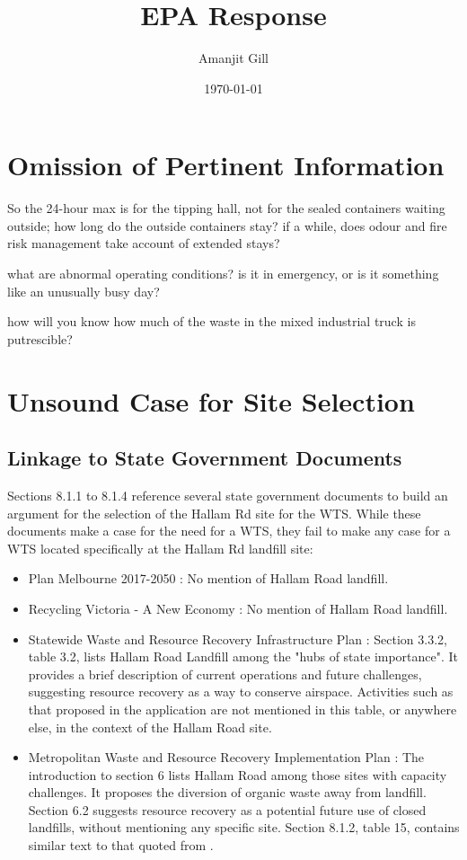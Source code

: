 \documentclass{article}
\title{EPA Response}
\author{\large Amanjit Gill}
\date{\small \today}
\begin{document}
\maketitle

\section{Omission of Pertinent Information}

So the 24-hour max is for the tipping hall, not for the sealed containers waiting outside; how long do the outside containers stay? if a while, does odour and fire risk management take account of extended stays?

what are abnormal operating conditions? is it in emergency, or is it something like an unusually busy day?

how will you know how much of the waste in the mixed industrial truck is putrescible?

\section{Unsound Case for Site Selection}

\subsection{Linkage to State Government Documents}

Sections 8.1.1 to 8.1.4 reference several state government documents to build an argument for the selection of the Hallam Rd site for the WTS. While these documents make a case for the need for a WTS, they fail to make any case for a WTS located specifically at the Hallam Rd landfill site:

\begin{itemize}
  \item Plan Melbourne 2017-2050 \cite{planmelb}: No mention of Hallam Road landfill.
  \item Recycling Victoria - A New Economy \cite{recyclingvic}: No mention of Hallam Road landfill.
  \item Statewide Waste and Resource Recovery Infrastructure Plan \cite{swrrip}: Section 3.3.2, table 3.2, lists Hallam Road Landfill among the "hubs of state importance". It provides a brief description of current operations and future challenges, suggesting resource recovery as a way to conserve airspace. Activities such as that proposed in the application are not mentioned in this table, or anywhere else, in the context of the Hallam Road site.
  \item Metropolitan Waste and Resource Recovery Implementation Plan \cite{mwrrip}: The introduction to section 6 lists Hallam Road among those sites with capacity challenges. It proposes the diversion of organic waste away from landfill. Section 6.2 suggests resource recovery as a potential future use of closed landfills, without mentioning any specific site. Section 8.1.2, table 15, contains similar text to that quoted from \cite{swrrip}.
\end{itemize}
\end{document}
